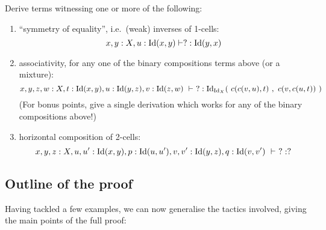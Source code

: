 \begin{exercise}Derive terms witnessing one or more of the following:
\begin{enumerate}
\item ``symmetry of equality'', i.e.\ (weak) inverses of 1-cells:
$$x,y:X, u:\mathrm{Id}(x,y) \vdash ? : \mathrm{Id}(y,x)$$

\item \label{ex:assoc}associativity, for any one of the binary compositions terms above (or a mixture):
$$x,y,z,w:X, t:\Id(x,y), u:\Id(y,z), v:\Id(z,w)\ \types\ ? : \Id_{\Id_X}(\ c(c(v,u),t)\ ,\ c(v,c(u,t))\ )$$
(For bonus points, give a single derivation which works for any of the binary compositions above!)

\item horizontal composition of 2-cells:
$$ x,y,z:X, u,u':\mathrm{Id}(x,y), p:\mathrm{Id}(u,u'), v,v':\mathrm{Id}(y,z), q:\mathrm{Id}(v,v')\ \vdash\ ? : ? $$
\end{enumerate}
\end{exercise}

\subsection*{Outline of the proof}
Having tackled a few examples, we can now generalise the tactics involved, giving the main points of the full proof:

